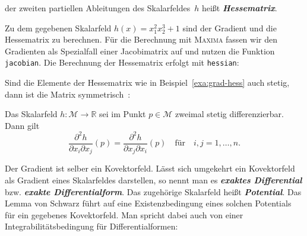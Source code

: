 der zweiten partiellen Ableitungen des Skalarfeldes~$h$ heißt \textbf{\em Hessematrix}.
\begin{example}
\label{exa:grad-hess}Zu dem gegebenen Skalarfeld $h(x)=x_{1}^{2}x_{2}^{3}+1$
sind der Gradient und die Hessematrix zu berechnen. Für die Berechnung
mit \textsc{Maxima} fassen wir den Gradienten als Spezialfall einer
Jacobimatrix auf und nutzen die Funktion \texttt{jacobian}. Die Berechnung
der Hessematrix erfolgt mit \texttt{hessian}:


\end{example}
Sind die Elemente der Hessematrix wie in Beispiel~\ref{exa:grad-hess}
auch stetig, dann ist die Matrix symmetrisch~\cite{koenigsberger2-2004}:

\begin{lemma}
\label{lem:Schwarz}Das
Skalarfeld $h:\mathcal{M}\to{\mathbb{R}}$ sei im Punkt $p\in\mathcal{M}$ zweimal
stetig differenzierbar. Dann gilt
\begin{equation}
\frac{\partial^{2}h}{\partial x_{i}\partial x_{j}}(p)=\frac{\partial^{2}h}{\partial x_{j}\partial x_{i}}(p)\quad\textrm{für}\quad i,j=1,\ldots,n.\label{eq:lemma-schwarz}
\end{equation}
\end{lemma}
Der Gradient ist selber ein Kovektorfeld. Lässt sich umgekehrt ein
Kovektorfeld als Gradient eines Skalarfeldes darstellen, so nennt
man es \textbf{\em exaktes Differential} bzw.
\textbf{\em exakte Differentialform}. Das
zugehörige Skalarfeld heißt \textbf{\em Potential}.
Das
Lemma von Schwarz führt auf eine Existenzbedingung eines solchen Potentials
für ein gegebenes Kovektorfeld. Man spricht dabei auch von einer Integrabilitätsbedingung
für Differentialformen:

